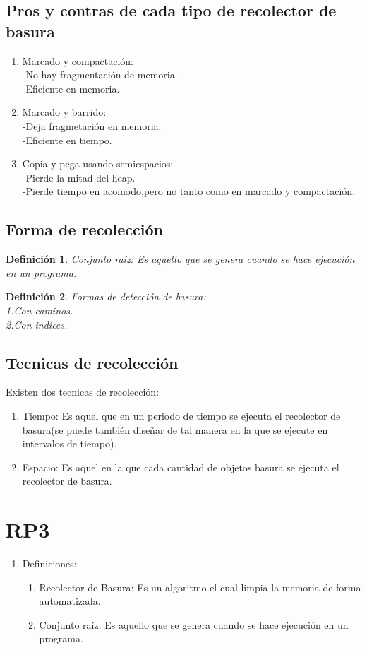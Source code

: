 \documentclass[letterpaper, 12pt]{article}
\newtheorem{definicion}{Definición}
\begin{document}
\subsection{Pros y contras de cada tipo de recolector de basura}
\begin{enumerate}
	\item Marcado y compactación:\\
	-No hay fragmentación de memoria.\\
	-Eficiente en memoria.
	\item Marcado y barrido:\\
	-Deja fragmetación en memoria.\\
	-Eficiente en tiempo.
	\item Copia y pega usando semiespacios:\\
	-Pierde la mitad del heap.\\
	-Pierde tiempo en acomodo,pero no tanto como en marcado y compactación.
\end{enumerate}

\subsection{Forma de recolección}
	\begin{definicion}
		Conjunto raíz: Es aquello que se genera cuando se hace ejecución en un programa.
	\end{definicion}
	\begin{definicion}
		Formas de detección de basura:\\
		1.Con caminos.\\
		2.Con indices.
	\end{definicion}

\subsection{Tecnicas de recolección}
	Existen dos tecnicas de recolección:
	\begin{enumerate}
		\item Tiempo: Es aquel que en un periodo de tiempo se ejecuta el recolector de basura(se puede también diseñar de tal manera en la que se ejecute en intervalos de tiempo).
		\item Espacio: Es aquel en la que cada cantidad de objetos basura se ejecuta el recolector de basura.
	\end{enumerate}

\section{RP3}
\begin{enumerate}
	\item Definiciones:
	\begin{enumerate}
		\item Recolector de Basura: Es un algoritmo el cual limpia la memoria de forma automatizada.
		\item Conjunto raíz: Es aquello que se genera cuando se hace ejecución en un programa.
	\end{enumerate}
\end{enumerate}
\end{document}
